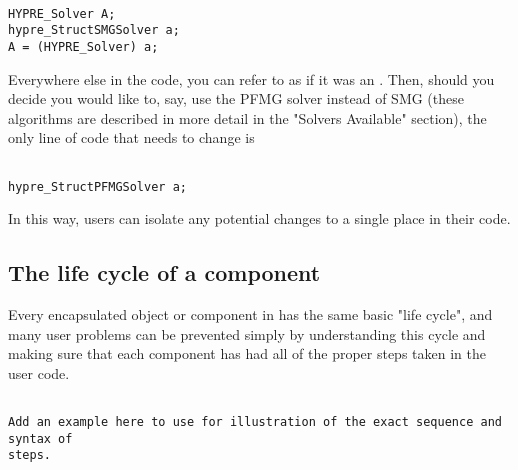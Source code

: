 \begin{enumerate}
\begin{display}
\begin{verbatim}

HYPRE_Solver A; 
hypre_StructSMGSolver a; 
A = (HYPRE_Solver) a; 

\end{verbatim}
\end{display}

Everywhere else in the code, you
can refer to  as if it 
was an . Then, should you decide you would like to, say, 
use the PFMG solver
instead of SMG (these 
algorithms are described in more detail in the "Solvers Available" section),
the only line of code that needs 
to change is 

\begin{display}
\begin{verbatim}

hypre_StructPFMGSolver a;

\end{verbatim}
\end{display}

In this way, users can isolate any
potential changes to a single 
place in their code.


\subsection{The life cycle of a component}

Every encapsulated object or component in \hypre{} has the same basic "life
cycle", and many user 
problems can be prevented simply by understanding this cycle and making sure
that each component has 
had all of the proper steps taken in the user code.

\begin{display}
\begin{verbatim}

Add an example here to use for illustration of the exact sequence and syntax of
steps.

\end{verbatim}
\end{display}

\begin{enumerate}


\end{enumerate}
\end{enumerate}
